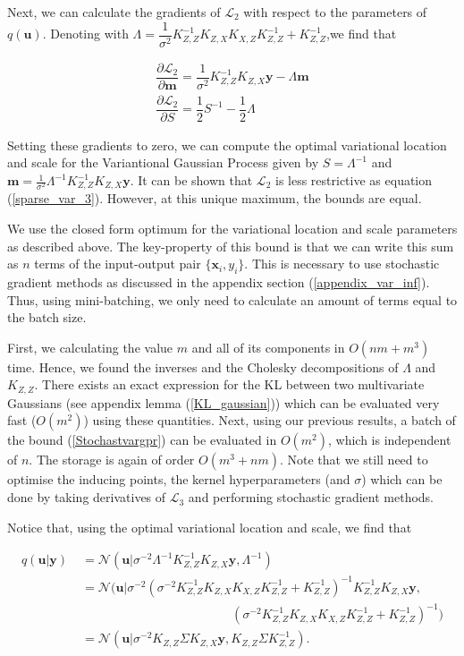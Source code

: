 \documentclass[12pt,a4paper,oneside]{book}
\begin{document}
Next, we can calculate the gradients of $\mathcal{L}_2$ with respect to the parameters of $q(\bm{u})$. Denoting with $\Lambda = \dfrac{1}{\sigma^2} K_{Z,Z}^{-1} K_{Z,X} K_{X,Z}   K_{Z,Z}^{-1} + K_{Z,Z}^{-1} $,we find that

\begin{align}
\dfrac{\partial \mathcal{L}_2}{\partial \bm{m}} = \dfrac{1}{\sigma^2} K_{Z,Z}^{-1} K_{Z,X} \bm{y} - \Lambda \bm{m} \nonumber \\
\dfrac{\partial \mathcal{L}_2}{\partial S} = \dfrac{1}{2} S^{-1} - \dfrac{1}{2} \Lambda
\end{align}

Setting these gradients to zero, we can compute the optimal variational
location and scale for the Variantional Gaussian Process given by $S = \Lambda^{-1}$ and $\bm{m} = \frac{1}{\sigma^2} \Lambda^{-1} K_{Z,Z}^{-1} K_{Z,X} \bm{y}$. It can be shown that $\mathcal{L}_2$ is less restrictive as equation (\ref{sparse_var_3}). However, at this unique maximum, the bounds are equal.

We use the closed form optimum for the variational location and scale parameters as described above. The key-property of this bound is that we can write this sum as $n$ terms of the input-output pair $\{ \bm{x}_i, y_i\}$. This is necessary to use stochastic gradient methods as discussed in the appendix section (\ref{appendix_var_inf}). Thus, using mini-batching, we only need to calculate an amount of terms equal to the batch size. 


First, we calculating the value $m$ and all of its components in $O(nm + m^3)$ time. Hence, we found the inverses and the Cholesky decompositions of $\Lambda$ and $K_{Z,Z}$. There exists an exact expression for the KL between two multivariate Gaussians (see appendix lemma (\ref{KL_gaussian})) which can be evaluated very fast ($O(m^2)$) using these quantities. Next, using our previous results, a batch of the bound (\ref{Stochastvargpr}) can be evaluated in $O(m^2)$, which is independent of $n$. The storage is again of order $O(m^3 + nm)$. Note that we still need to optimise the inducing points, the kernel hyperparameters (and $\sigma$) which can be done by taking derivatives of $\mathcal{L}_3$ and performing stochastic gradient methods.

Notice that, using the optimal variational location and scale, we find that

\begin{align}
q(\bm{u}| \bm{y}) &= \mathcal{N}(\bm{u}| \sigma^{-2} \Lambda^{-1} K_{Z,Z}^{-1} K_{Z,X} \bm{y}, \Lambda^{-1} )  \nonumber \\
&= \mathcal{N}(\bm{u}| \sigma^{-2} (\sigma^{-2} K_{Z,Z}^{-1} K_{Z,X} K_{X,Z}   K_{Z,Z}^{-1} + K_{Z,Z}^{-1})^{-1}  K_{Z,Z}^{-1} K_{Z,X} \bm{y}, \nonumber \\ \qquad \qquad &\qquad \qquad \qquad \qquad \qquad \qquad (\sigma^{-2} K_{Z,Z}^{-1} K_{Z,X} K_{X,Z}   K_{Z,Z}^{-1} + K_{Z,Z}^{-1})^{-1} ) \nonumber \\
&= \mathcal{N} (\bm{u}|\sigma^{-2} K_{Z,Z} \Sigma K_{Z,X} \bm{y}, K_{Z,Z}\Sigma K_{Z,Z}^{-1}).
\end{align}
\end{document}

